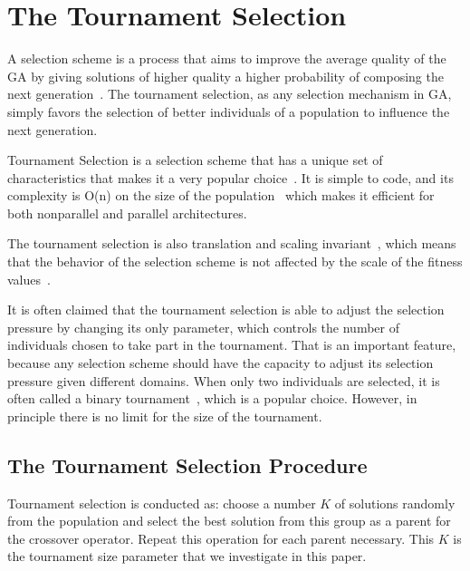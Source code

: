 \section{The Tournament Selection}\label{sec:background:Selection Scheme} 


A selection scheme is a process that aims to improve the average
quality of the GA by giving solutions of higher quality a higher
probability of composing the next
generation~\cite{blickle1995mathematical}.  The tournament selection,
as any selection mechanism in GA, simply favors the selection of
better individuals of a population to influence the next generation.

Tournament Selection is a selection scheme that has a unique set of
characteristics that makes it a very popular
choice~\cite{blickle1995mathematical}. It is simple to code, and its
complexity is O(n) on the size of the
population~\cite{goldberg1991comparative} which makes it efficient for
both nonparallel and parallel architectures.

 The tournament selection is also translation and scaling
 invariant~\cite{maza1993analysis}, which means that the behavior of
 the selection scheme is not affected by the scale of the fitness
 values~\cite{back2000evolutionary}.


It is often claimed that the tournament selection is able to adjust
the selection pressure by changing its only parameter, which controls
the number of individuals chosen to take part in the tournament. That
is an important feature, because any selection scheme should have the
capacity to adjust its selection pressure given different
domains. When only two individuals are selected, it is often called a
binary tournament~\cite{blickle1995mathematical,
  goldberg1991comparative}, which is a popular choice. However, in
principle there is no limit for the size of the tournament.

\subsection{The Tournament Selection Procedure}\label{sec:background:tournament_selection} 



Tournament selection is conducted as: choose a number $K$ of solutions randomly from the population and select the best solution from this group as a parent for the crossover operator. Repeat this operation for each parent necessary. This $K$ is the tournament size parameter that we investigate in this paper.




